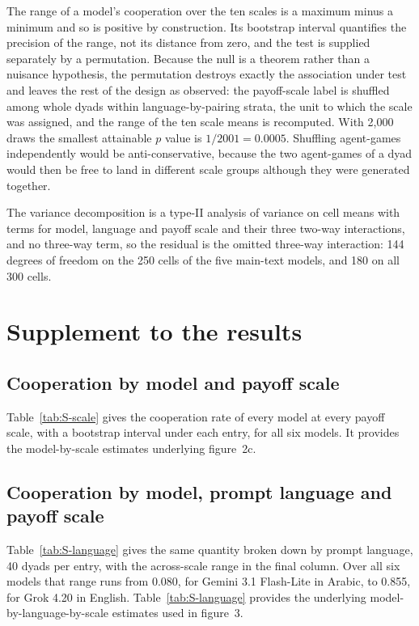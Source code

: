 \documentclass[11pt,a4paper]{article}
\begin{document}
The range of a model's cooperation over the ten scales is a maximum minus a minimum and so is positive by construction. Its bootstrap interval quantifies the precision of the range, not its distance from zero, and the test is supplied separately by a permutation. Because the null is a theorem rather than a nuisance hypothesis, the permutation destroys exactly the association under test and leaves the rest of the design as observed: the payoff-scale label is shuffled among whole dyads within language-by-pairing strata, the unit to which the scale was assigned, and the range of the ten scale means is recomputed. With 2{,}000 draws the smallest attainable $p$ value is $1/2001 = 0.0005$. Shuffling agent-games independently would be anti-conservative, because the two agent-games of a dyad would then be free to land in different scale groups although they were generated together.

The variance decomposition is a type-II analysis of variance on cell means with terms for model, language and payoff scale and their three two-way interactions, and no three-way term, so the residual is the omitted three-way interaction: 144 degrees of freedom on the 250 cells of the five main-text models, and 180 on all 300 cells.


\section{Supplement to the results}\label{appendix:results}

\subsection{Cooperation by model and payoff scale}\label{appendix:by_scale}

Table~\ref{tab:S-scale} gives the cooperation rate of every model at every payoff scale, with a bootstrap interval under each entry, for all six models. It provides the model-by-scale estimates underlying figure~2c.

\subsection{Cooperation by model, prompt language and payoff scale}\label{appendix:by_language}

Table~\ref{tab:S-language} gives the same quantity broken down by prompt language, 40 dyads per entry, with the across-scale range in the final column. Over all six models that range runs from 0.080, for Gemini 3.1 Flash-Lite in Arabic, to 0.855, for Grok 4.20 in English. Table~\ref{tab:S-language} provides the underlying model-by-language-by-scale estimates used in figure~3.
\end{document}
